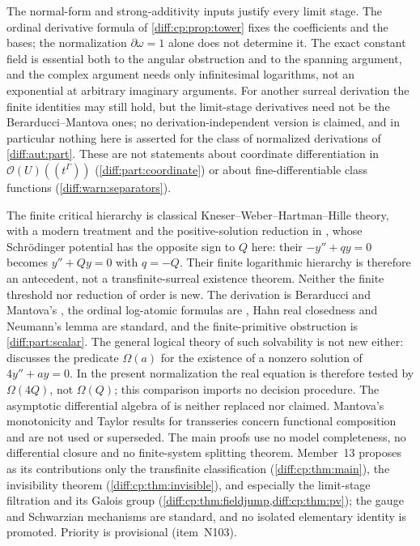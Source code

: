 \documentclass[11pt,letterpaper]{article}
\numberwithin{equation}{section}
\theoremstyle{definition}
\theoremstyle{remark}
\newcommand{\der}{\partial}
\newcommand{\Hol}{\mathscr O}
\begin{document}
\begin{remark}
\label{diff:cp:rem:derivation}
The normal-form and strong-additivity inputs justify every limit stage. The
ordinal derivative formula of \cref{diff:cp:prop:tower} fixes the coefficients
and the bases; the normalization $\der\omega=1$ alone does not determine it.
The exact constant field is essential both to the angular obstruction and to
the spanning argument, and the complex argument needs only infinitesimal
logarithms, not an exponential at arbitrary imaginary arguments. For another
surreal derivation the finite identities may still hold, but the limit-stage
derivatives need not be the Berarducci--Mantova ones; no derivation-independent
version is claimed, and in particular nothing here is asserted for the class
of normalized derivations of \cref{diff:aut:part}. These are not statements
about coordinate differentiation in $\Hol(U)((t^{\Gamma}))$
(\cref{diff:part:coordinate}) or about fine-differentiable class functions
(\cref{diff:warn:separators}).
\end{remark}

\begin{remark}
\label{diff:cp:rem:inputs}
The finite critical hierarchy is classical Kneser--Weber--Hartman--Hille
theory, with a modern treatment and the positive-solution reduction in
\cite[Section~2, especially (2.5) and Corollary~2.3]{KT}, whose
Schr\"odinger potential has the opposite sign to $Q$ here: their
$-y''+qy=0$ becomes $y''+Qy=0$ with $q=-Q$.
Their finite logarithmic hierarchy is therefore an antecedent,
not a transfinite-surreal existence theorem. Neither the finite
threshold nor reduction of order is new. The
derivation is Berarducci and Mantova's \cite{BM}, the ordinal log-atomic
formulas are \cite[Section~2]{ADH}, Hahn real closedness and Neumann's lemma are
standard, and the finite-primitive obstruction is \cref{diff:part:scalar}. The
general logical theory of such solvability is not new either:
\cite[p.~17]{ADH} discusses the predicate $\Omega(a)$ for the existence of a
nonzero solution of $4y''+ay=0$. In the present normalization the
real equation is therefore tested by $\Omega(4Q)$, not
$\Omega(Q)$; this comparison imports no decision procedure.
The asymptotic differential algebra of
\cite{ADHBook} is neither replaced nor claimed. Mantova's monotonicity and
Taylor results for transseries \cite{Mantova2026} concern functional
composition and are not used or superseded. The main proofs use no model
completeness, no differential closure and no finite-system splitting theorem.
Member~13 proposes as its contributions only the transfinite classification
(\cref{diff:cp:thm:main}), the invisibility theorem
(\cref{diff:cp:thm:invisible}), and especially the limit-stage filtration and
its Galois group (\cref{diff:cp:thm:fieldjump,diff:cp:thm:pv}); the gauge and Schwarzian mechanisms
are standard, and no isolated elementary identity is promoted. Priority is
provisional (item~N103).
\end{remark}
\end{document}
